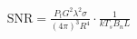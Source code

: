 \documentclass[preview]{standalone}
\begin{document}
\begin{align*}
\text{SNR} = \frac{P_t G^2 \lambda^2 \sigma}{(4 \pi)^3 R^4} \cdot \frac{1}{k T_s B_n L}
\end{align*}
\end{document}

